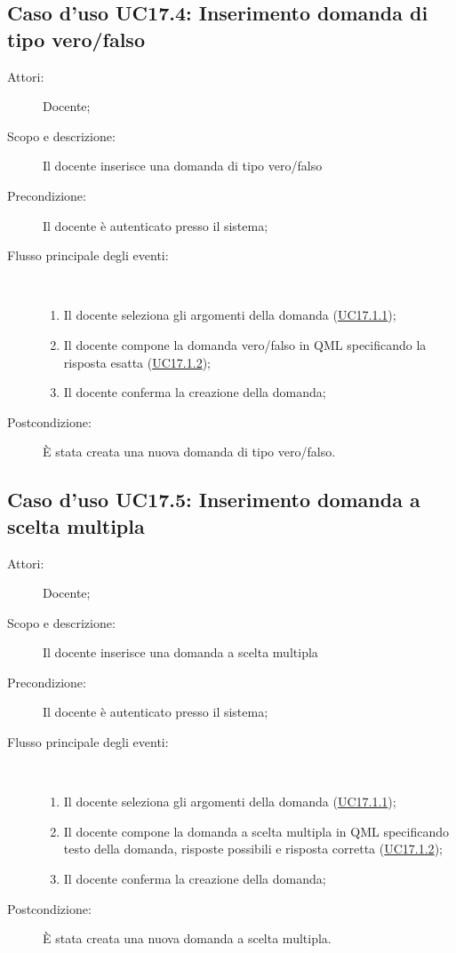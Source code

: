 \subsection{Caso d'uso UC17.4: Inserimento domanda di tipo vero/falso}\begin{description}
	\item[Attori:] Docente;
	\item[Scopo e descrizione:] Il docente inserisce una domanda di tipo vero/falso
	\item[Precondizione:] Il docente è autenticato presso il sistema;
	
	\item[Flusso principale degli eventi:] \ 
	\begin{enumerate}
		\item Il docente seleziona gli argomenti della domanda (\hyperlink{UC17.1.1}{UC17.1.1});
		\item Il docente compone la domanda vero/falso in QML specificando la risposta esatta (\hyperlink{UC17.1.2}{UC17.1.2});
		\item Il docente conferma la creazione della domanda;
		
	\end{enumerate}
	\item[Postcondizione:] È stata creata una nuova domanda di tipo vero/falso.
\end{description}
\hypertarget{UC17.5}{}
\subsection{Caso d'uso UC17.5: Inserimento domanda a scelta multipla}\begin{description}
	\item[Attori:] Docente;
	\item[Scopo e descrizione:] Il docente inserisce una domanda a scelta multipla
	\item[Precondizione:] Il docente è autenticato presso il sistema;
	
	\item[Flusso principale degli eventi:] \ 
	\begin{enumerate}
		\item Il docente seleziona gli argomenti della domanda (\hyperlink{UC17.1.1}{UC17.1.1});
		\item Il docente compone la domanda a scelta multipla in QML specificando testo della domanda, risposte possibili e risposta corretta (\hyperlink{UC17.1.2}{UC17.1.2});
		\item Il docente conferma la creazione della domanda;
		
	\end{enumerate}
	\item[Postcondizione:] È stata creata una nuova domanda a scelta multipla.
\end{description}
\hypertarget{UC17.6}{}
